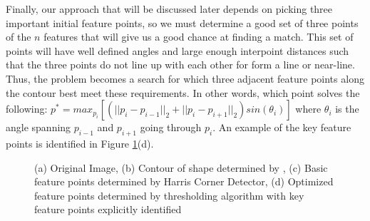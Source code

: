 \documentclass[paper=a4, fontsize=11pt]{scrartcl} %
\begin{document}

Finally, our approach that will be discussed later depends on picking three important initial feature points, so we must determine a good set of three points of the $n$ features that will give us a good chance at finding a match. This set of points will have well defined angles and large enough interpoint distances such that the three points do not line up with each other for form a line or near-line. Thus, the problem becomes a search for which three adjacent feature points along the contour best meet these requirements. In other words, which point solves the following: $p^* = max_{p_i} [ (||p_i - p_{i-1}||_2 + ||p_i - p_{i+1}||_2) sin(\theta_i) ]$ where $\theta_i$ is the angle spanning $p_{i-1}$ and $p_{i+1}$ going through $p_i$. An example of the key feature points is identified in Figure \ref{feat_detect}(d). 

\pagebreak

\begin{figure}
\caption{(a) Original Image, (b) Contour of shape determined by \cite{Suzuki1985}, (c) Basic feature points determined by Harris Corner Detector, (d) Optimized feature points determined by thresholding algorithm with key feature points explicitly identified}
\label{feat_detect}
\end{figure}
\end{document}
